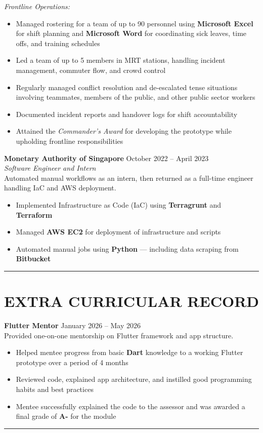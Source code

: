 \documentclass[11pt,a4paper]{article}
\newcommand{\sectionrule}{\noindent\rule{\textwidth}{0.8pt}}
\newcommand{\entrytitle}[2]{%
  \noindent\textbf{#1} \hfill #2\\
}
\newcommand{\entrysub}[1]{%
  \textit{#1}\\
}
\begin{document}
\textit{Frontline Operations:}
\begin{itemize}
  \item Managed rostering for a team of up to 90 personnel using \textbf{Microsoft Excel} for shift planning and \textbf{Microsoft Word} for coordinating sick leaves, time offs, and training schedules
  \item Led a team of up to 5 members in MRT stations, handling incident management, commuter flow, and crowd control
  \item Regularly managed conflict resolution and de-escalated tense situations involving teammates, members of the public, and other public sector workers
  \item Documented incident reports and handover logs for shift accountability
  \item Attained the \textit{Commander's Award} for developing the prototype while upholding frontline responsibilities
\end{itemize}

\vspace{4pt}
\entrytitle{Monetary Authority of Singapore}{October 2022 -- April 2023}
\entrysub{Software Engineer and Intern}
Automated manual workflows as an intern, then returned as a full-time engineer handling IaC and AWS deployment.

\begin{itemize}
  \item Implemented Infrastructure as Code (IaC) using \textbf{Terragrunt} and \textbf{Terraform}
  \item Managed \textbf{AWS EC2} for deployment of infrastructure and scripts
  \item Automated manual jobs using \textbf{Python} --- including data scraping from \textbf{Bitbucket}
\end{itemize}

\sectionrule

\section*{EXTRA CURRICULAR RECORD}
\vspace{2pt}

\entrytitle{Flutter Mentor}{January 2026 -- May 2026}
Provided one-on-one mentorship on Flutter framework and app structure.

\begin{itemize}
  \item Helped mentee progress from basic \textbf{Dart} knowledge to a working Flutter prototype over a period of 4 months
  \item Reviewed code, explained app architecture, and instilled good programming habits and best practices
  \item Mentee successfully explained the code to the assessor and was awarded a final grade of \textbf{A-} for the module
\end{itemize}

\sectionrule
\end{document}
